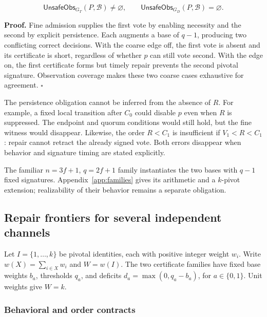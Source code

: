 \[
\mathsf{UnsafeObs}_{G_T}(P,\mathcal B)\ne\varnothing,
\qquad
\mathsf{UnsafeObs}_{G_D}(P,\mathcal B)=\varnothing.
\]

\textbf{Proof.} Fine admission supplies the first vote by enabling
necessity and the second by explicit persistence. Each augments a base
of \(q-1\), producing two conflicting correct decisions. With the coarse
edge off, the first vote is absent and its certificate is short,
regardless of whether \(p\) can still vote second. With the edge on, the
first certificate forms but timely repair prevents the second pivotal
signature. Observation coverage makes these two coarse cases exhaustive
for agreement. \(\square\)

The persistence obligation cannot be inferred from the absence of \(R\).
For example, a fixed local transition after \(C_0\) could disable \(p\)
even when \(R\) is suppressed. The endpoint and quorum conditions would
still hold, but the fine witness would disappear. Likewise, the order
\(R<C_1\) is insufficient if \(V_1<R<C_1\): repair cannot retract the
already signed vote. Both errors disappear when behavior and signature
timing are stated explicitly.

The familiar \(n=3f+1\), \(q=2f+1\) family instantiates the two bases
with \(q-1\) fixed signatures. Appendix~\ref{app:families} gives its
arithmetic and a \(k\)-pivot extension; realizability of their behavior
remains a separate obligation.

\subsection{Repair frontiers for several independent
channels}\label{repair-frontiers-for-several-independent-channels}

Let \(I=\{1,\ldots,k\}\) be pivotal identities, each with positive
integer weight \(w_i\). Write \(w(X)=\sum_{i\in X}w_i\) and \(W=w(I)\).
The two certificate families have fixed base weights \(b_a\), thresholds
\(q_a\), and deficits \(d_a=\max(0,q_a-b_a)\), for \(a\in\{0,1\}\). Unit
weights give \(W=k\).

\subsubsection{Behavioral and order
contracts}\label{behavioral-and-order-contracts}

